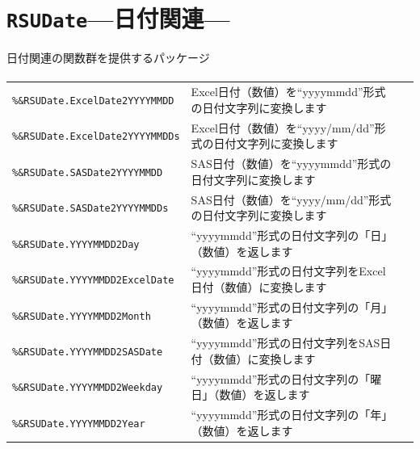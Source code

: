 \section{\texttt{RSUDate}\;---\;日付関連\;---}\label{sec:RSUDate}
日付関連の関数群を提供するパッケージ
\paragraph{\DocStrTitleRDMPackageFunctionList}
\begin{center}
{\footnotesize
\begin{xltabular}{\textwidth}{|p{4truecm}|X|p{1.2truecm}|}
\hline
\thead{\DocStrHeaderFunctionName}&\thead{\DocStrDescription}&\thead{\DocStrRefto}\\
\hline
\hline
\texttt{\%\&RSUDate.ExcelDate2YYYYMMDD}&Excel日付（数値）を``yyyymmdd''形式の日付文字列に変換します&\\
\hline
\texttt{\%\&RSUDate.ExcelDate2YYYYMMDDs}&Excel日付（数値）を``yyyy/mm/dd''形式の日付文字列に変換します&\\
\hline
\texttt{\%\&RSUDate.SASDate2YYYYMMDD}&SAS日付（数値）を``yyyymmdd''形式の日付文字列に変換します&\\
\hline
\texttt{\%\&RSUDate.SASDate2YYYYMMDDs}&SAS日付（数値）を``yyyy/mm/dd''形式の日付文字列に変換します&\\
\hline
\texttt{\%\&RSUDate.YYYYMMDD2Day}&``yyyymmdd''形式の日付文字列の「日」（数値）を返します&\\
\hline
\texttt{\%\&RSUDate.YYYYMMDD2ExcelDate}&``yyyymmdd''形式の日付文字列をExcel日付（数値）に変換します&\\
\hline
\texttt{\%\&RSUDate.YYYYMMDD2Month}&``yyyymmdd''形式の日付文字列の「月」（数値）を返します&\\
\hline
\texttt{\%\&RSUDate.YYYYMMDD2SASDate}&``yyyymmdd''形式の日付文字列をSAS日付（数値）に変換します&\\
\hline
\texttt{\%\&RSUDate.YYYYMMDD2Weekday}&``yyyymmdd''形式の日付文字列の「曜日」（数値）を返します&\\
\hline
\texttt{\%\&RSUDate.YYYYMMDD2Year}&``yyyymmdd''形式の日付文字列の「年」（数値）を返します&\\

\end{xltabular}}
\end{center}
